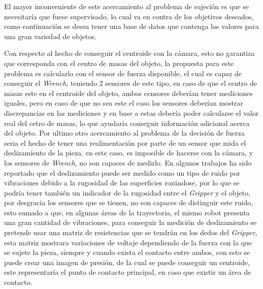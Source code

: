 El mayor inconveniente de este acercamiento al problema de sujeción es que se necesitaría que fuese supervisado, lo cual va en contra de los objetivos deseados, como continuación se desea tener una base de datos que contenga los valores para una gran variedad de objetos.


Con respecto al hecho de conseguir el centroide con la cámara, esto no garantiza que corresponda con el centro de masas del objeto, la propuesta para este problema es calcularlo con el sensor de fuerza disponible, el cual es capaz de conseguir el \textit{Wrench}, teniendo 2 sensores de este tipo, en caso de que el centro de masas este en el centroide del objeto, ambos censores deberían tener mediciones iguales, pero en caso de que no sea este el caso los sensores deberían mostrar discrepancias en las mediciones y en base a estas debería poder calcularse el valor real del cetro de masas, lo que ayudaría conseguir información adicional acerca del objeto.
Por ultimo otro acercamiento al problema de la decisión de fuerza seria el hecho de tener una realimentación por parte de un sensor que mida el deslizamiento de la pieza, en este caso, es imposible de hacerse con la cámara, y los sensores de \textit{Wrench}, no son capaces de medirlo. En algunos trabajos ha sido reportado que el deslizamiento puede ser medido como un tipo de ruido por vibraciones debido a la rugosidad de las superficies rozándose, por lo que se podría tener también un indicador de la rugosidad entre el \textit{Gripper} y el objeto, por desgracia los sensores que se tienen, no son capaces de distinguir este ruido, esto sumado a que, en algunas áreas de la trayectoria, el mismo robot presenta una gran cantidad de vibraciones, para conseguir la medición de deslizamiento se pretende usar una matriz de resistencias que se tendrán en los dedos del \textit{Gripper}, esta matriz mostrara variaciones de voltaje dependiendo de la fuerza con la que se sujete la pieza, siempre y cuando exista el contacto entre ambos, con esto se puede crear una imagen de presión, de la cual se puede conseguir un centroide, este representaría el punto de contacto principal, en caso que existir un área de contacto. 
